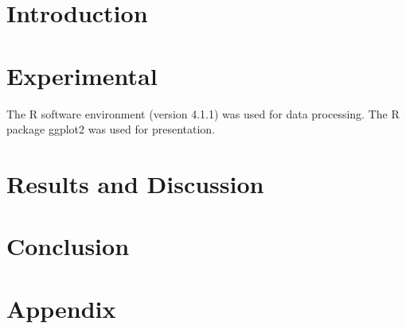 \documentclass{PPACDW}
\title{}
\author{Liliana Schefer}{lschefe@student.ethz.ch}
\begin{document}
\maketitle
\newpage

\section*{Introduction}

\section*{Experimental}



The R software environment \cite{R} (version 4.1.1) was used for data processing. The R package ggplot2 \cite{ggplot2} was used for presentation.

\section*{Results and Discussion}

\section*{Conclusion}

\printbibliography

\appendix
  \section*{Appendix}
  \renewcommand\thefigure{A\arabic{figure}} %
  \setcounter{figure}{0}
\end{document}
